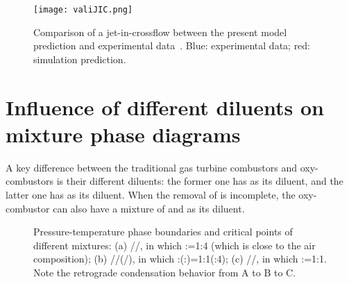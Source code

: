     \begin{figure}[htb]
        \begin{center}
            \texttt{[image: valiJIC.png]}
        \end{center}
        \caption{Comparison of a jet-in-crossflow between the present model prediction and experimental data~\cite{su2004simultaneous}. Blue: experimental data; red: simulation prediction.}
        \label{valiJIC}
    \end{figure}


\section{Influence of different diluents on mixture phase diagrams} \label{app:trad}
A key difference between the traditional gas turbine combustors and  oxy-combustors is their different diluents: the former one has  as its diluent, and the latter one has  as its diluent. When the removal of  is incomplete, the  oxy-combustor can also have a mixture of  and  as its diluent.

    \begin{figure}[htb]
        \centering



        \caption{Pressure-temperature phase boundaries and critical points of different mixtures: (a) //, in which :=1:4 (which is close to the air composition); (b) //(/), in which :(:)=1:1(:4); (c) //, in which :=1:1. Note the retrograde condensation behavior from A to B to C.}
        \label{v4}
    \end{figure}

